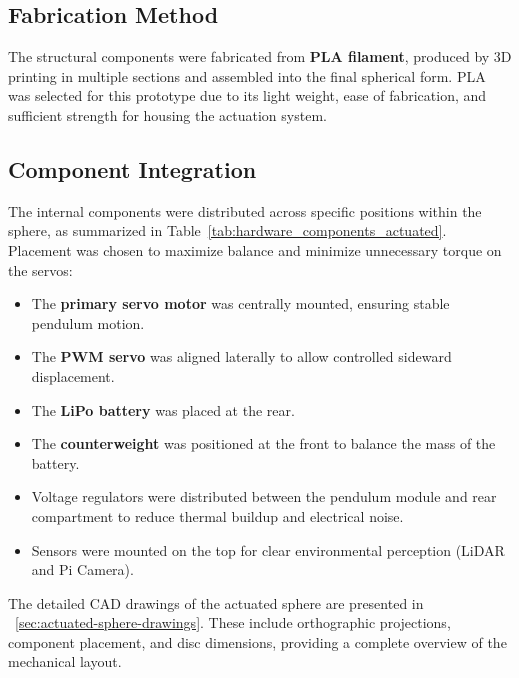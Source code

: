 \documentclass[english, bachelor, utf8]{base/thesis_telematics}
\begin{document}
\subsection{Fabrication Method}
The structural components were fabricated from \textbf{PLA filament}, produced by 3D printing in multiple sections and assembled into the final spherical form. PLA was selected for this prototype due to its light weight, ease of fabrication, and sufficient strength for housing the actuation system.  

\subsection{Component Integration}
The internal components were distributed across specific positions within the sphere, as summarized in Table~\ref{tab:hardware_components_actuated}. Placement was chosen to maximize balance and minimize unnecessary torque on the servos:  

\begin{itemize}
    \item The \textbf{primary servo motor} was centrally mounted, ensuring stable pendulum motion.  
    \item The \textbf{PWM servo} was aligned laterally to allow controlled sideward displacement.  
    \item The \textbf{LiPo battery} was placed at the rear.
    \item The \textbf{counterweight} was positioned at the front to balance the mass of the battery.
    \item Voltage regulators were distributed between the pendulum module and rear compartment to reduce thermal buildup and electrical noise.  
    \item Sensors were mounted on the top for clear environmental perception (LiDAR and Pi Camera).  
\end{itemize}

The detailed CAD drawings of the actuated sphere are presented in ~\ref{sec:actuated-sphere-drawings}.
These include orthographic projections, component placement, and disc dimensions, providing a complete overview of the mechanical layout.  
\end{document}
